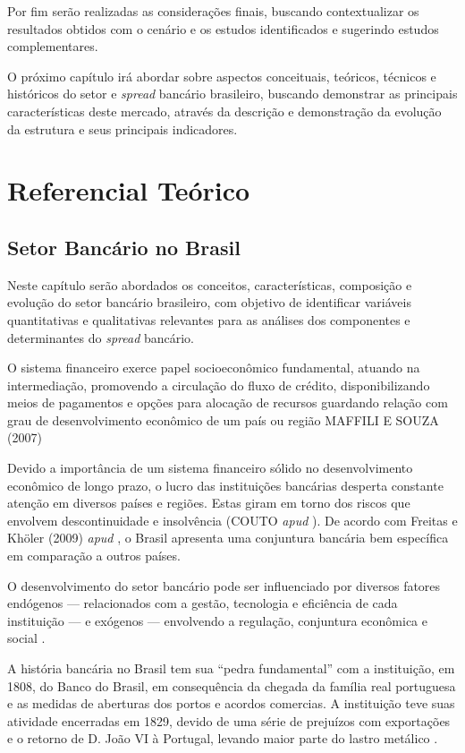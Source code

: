 \documentclass[12pt,12pt,openright,oneside,a4paper,chapter=TITLE,section=TITLE,subsection=TITLE,subsubsection=TITLE,english,french,spanish,portugues,sumario=tradicional]{abntex2}
\begin{document}
Por fim serão realizadas as considerações finais, buscando contextualizar os resultados obtidos com o cenário e os estudos identificados e sugerindo estudos complementares.

O próximo capítulo irá abordar sobre aspectos conceituais, teóricos, técnicos e históricos do setor e \emph{spread} bancário brasileiro, buscando demonstrar as principais características deste mercado, através da descrição e demonstração da evolução da estrutura e seus principais indicadores.

\textual
\pagestyle{simple}

\chapter{Referencial Teórico}

\section{Setor Bancário no Brasil}

Neste capítulo serão abordados os conceitos, características, composição e
evolução do setor bancário brasileiro, com objetivo de identificar variáveis
quantitativas e qualitativas relevantes para as análises dos componentes e
determinantes do \emph{spread} bancário.

O sistema financeiro exerce papel socioeconômico fundamental, atuando na intermediação, promovendo a circulação do fluxo de crédito, disponibilizando meios de pagamentos e opções para alocação de recursos guardando relação com grau de desenvolvimento econômico de um país ou região MAFFILI E SOUZA (2007) \cite{timotio:2018}

Devido a importância de um sistema financeiro sólido no desenvolvimento
econômico de longo prazo, o lucro das instituições bancárias desperta constante
atenção em diversos países e regiões. Estas giram em torno dos riscos que
envolvem descontinuidade e insolvência (COUTO \emph{apud} \cite{dantas:2012}). De
acordo com Freitas e Khöler (2009) \emph{apud} \textcite{dantas:2012}, o Brasil
apresenta uma conjuntura bancária bem específica em comparação a outros países.

O desenvolvimento do setor bancário pode ser influenciado por diversos fatores
endógenos --- relacionados com a gestão, tecnologia e eficiência de cada
instituição --- e exógenos --- envolvendo a regulação, conjuntura econômica e
social \cite{rover:2011}.

A história bancária no Brasil tem sua ``pedra fundamental'' com a instituição, em 1808, do Banco do Brasil, em consequência da chegada da família real portuguesa e as medidas de aberturas dos portos e acordos comercias. A instituição teve suas atividade encerradas em 1829, devido de uma série de prejuízos com exportações e o retorno de D. João VI à Portugal, levando maior parte do lastro metálico \cite{camargo:2009}.
\end{document}
